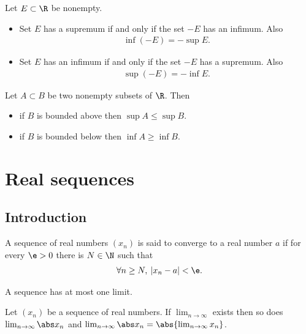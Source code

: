 \documentclass{article}
\begin{document}
\begin{theorem}
    Let $E\subset\R$ be nonempty.
    \begin{itemize}
        \item Set $E$ has a supremum if and only if the set $-E$ has an infimum. Also \begin{align*}
            \inf(-E) = -\sup E.
        \end{align*}
        \item Set $E$ has an infimum if and only if the set $-E$ has a supremum. Also \begin{align*}
            \sup(-E) = -\inf E.
        \end{align*}
    \end{itemize}
\end{theorem}

\begin{lemma}
    Let $A\subset B$ be two nonempty subsets of $\R$. Then
    \begin{itemize}
        \item if $B$ is bounded above then $\sup A\leq\sup B$.
        \item if $B$ is bounded below then $\inf A\geq\inf B$.
    \end{itemize} 
\end{lemma}


\section{Real sequences}


\subsection{Introduction}

\begin{definition}
    A sequence of real numbers $(x_n)$ is said to converge to a real number $a$
    if for every $\e>0$ there is $N\in\N$ such that
    \begin{align*}
        \forall n\geq N,\: |x_n-a|<\e.
    \end{align*}
\end{definition}

\setcounter{theorem}{5}
\begin{lemma}
    A sequence has at most one limit.
\end{lemma}

\begin{lemma}
    Let $(x_n)$ be a sequence of real numbers. If $\lim_{n\to\infty}$ exists then so does
    $\lim_{n\to\infty}\abs x_n$ and $\lim_{n\to\infty}\abs x_n=\abs{\lim_{n\to\infty}x_n}$.
\end{lemma}
\end{document}
